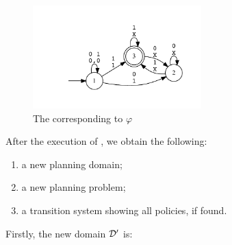 \begin{figure}[h]
\centering
\includegraphics[width=0.58\textwidth]{images/automa-param3}
\caption{The \DFA corresponding to $\varphi$} 
\label{fig:dfa-result-pltl}
\end{figure}

After the execution of \FONDFOR, we obtain the following:
\begin{enumerate}
\item a new planning domain;
\item a new planning problem;
\item a transition system showing all policies, if found.
\end{enumerate}
Firstly, the new domain $\mathcal{D}'$ is:
